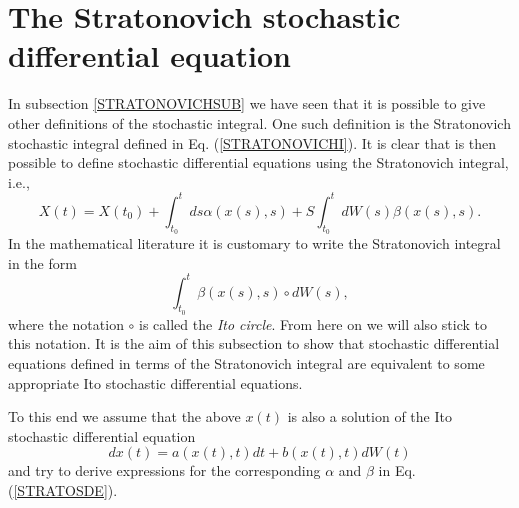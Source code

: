 \section{The Stratonovich stochastic differential equation}
In subsection \ref{STRATONOVICHSUB} we have seen that it is 
possible to give other definitions of the stochastic integral.
One such definition is the Stratonovich stochastic integral defined 
in Eq. (\ref{STRATONOVICHI}). It is clear that is then possible 
to define stochastic differential equations using the 
Stratonovich integral, i.e.,
\begin{equation}
\label{STRATOSDE}
X(t) = X(t_0) + \int_{t_0}^t ds \alpha(x(s),s) +
      S \int_{t_0}^t dW(s) \beta(x(s),s).
\end{equation}
In the mathematical literature it is customary to write
the Stratonovich integral in the form
\begin{equation*}
\int_{t_0}^t  \beta(x(s),s) \circ dW(s),
\end{equation*}
where the notation $\circ$ is called the {\em Ito circle}. From
here on we will also stick to this notation.
It is the aim of this subsection to show that stochastic 
differential equations defined in terms of the Stratonovich 
integral are equivalent to some appropriate Ito stochastic 
differential equations.

To this end we assume that the above $x(t)$ is also a solution of the Ito 
stochastic differential equation
\begin{equation}
\label{ITOSDEINS}
dx(t) = a(x(t),t) dt + b(x(t),t) dW(t)
\end{equation}
and try to derive expressions for the corresponding $\alpha$ and $\beta$
in Eq. (\ref{STRATOSDE}).

